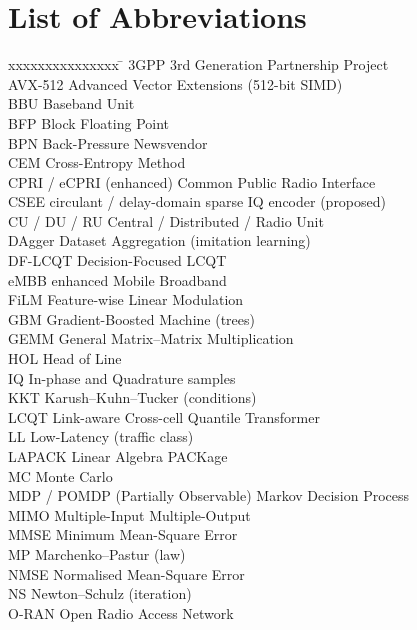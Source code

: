 \documentclass[12pt,a4paper,oneside]{report}
\theoremstyle{definition}
\begin{document}
\chapter*{List of Abbreviations}
\begin{tabbing}
xxxxxxxxxxxxxxx \= \kill
3GPP \> 3rd Generation Partnership Project\\
AVX-512 \> Advanced Vector Extensions (512-bit SIMD)\\
BBU \> Baseband Unit\\
BFP \> Block Floating Point\\
BPN \> Back-Pressure Newsvendor\\
CEM \> Cross-Entropy Method\\
CPRI / eCPRI \> (enhanced) Common Public Radio Interface\\
CSEE \> circulant / delay-domain sparse IQ encoder (proposed)\\
CU / DU / RU \> Central / Distributed / Radio Unit\\
DAgger \> Dataset Aggregation (imitation learning)\\
DF-LCQT \> Decision-Focused LCQT\\
eMBB \> enhanced Mobile Broadband\\
FiLM \> Feature-wise Linear Modulation\\
GBM \> Gradient-Boosted Machine (trees)\\
GEMM \> General Matrix--Matrix Multiplication\\
HOL \> Head of Line\\
IQ \> In-phase and Quadrature samples\\
KKT \> Karush--Kuhn--Tucker (conditions)\\
LCQT \> Link-aware Cross-cell Quantile Transformer\\
LL \> Low-Latency (traffic class)\\
LAPACK \> Linear Algebra PACKage\\
MC \> Monte Carlo\\
MDP / POMDP \> (Partially Observable) Markov Decision Process\\
MIMO \> Multiple-Input Multiple-Output\\
MMSE \> Minimum Mean-Square Error\\
MP \> Marchenko--Pastur (law)\\
NMSE \> Normalised Mean-Square Error\\
NS \> Newton--Schulz (iteration)\\
O-RAN \> Open Radio Access Network\\

\end{tabbing}
\end{document}
